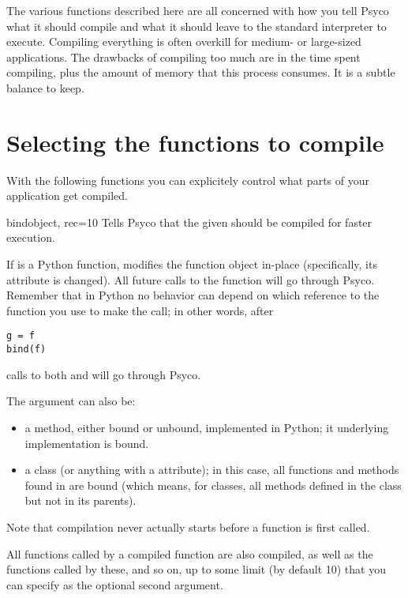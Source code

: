 \documentclass{manual}
\begin{document}
The various functions described here are all concerned with how you tell Psyco what it should compile and what it should leave to the standard interpreter to execute.  Compiling everything is often overkill for medium- or large-sized applications.  The drawbacks of compiling too much are in the time spent compiling, plus the amount of memory that this process consumes.  It is a subtle balance to keep.


\section{Selecting the functions to compile}

With the following functions you can explicitely control what parts of your application get compiled.

\begin{funcdesc}{bind}{object, rec=10}
  Tells Psyco that the given  should be compiled for faster execution.

  If  is a Python function,   modifies the function object in-place (specifically, its  attribute is changed).  All future calls to the function will go through Psyco.  Remember that in Python no behavior can depend on which reference to the function you use to make the call; in other words, after

\begin{verbatim}
g = f
bind(f)
\end{verbatim}

  calls to both  and  will go through Psyco.

  The  argument can also be:
  \begin{itemize}
    \item a method, either bound or unbound, implemented in Python; it underlying implementation is bound.
    \item a class (or anything with a  attribute); in this case, all functions and methods found in  are bound (which means, for classes, all methods defined in the class but not in its parents).
  \end{itemize}

  Note that compilation never actually starts before a function is first called.

  All functions called by a compiled function are also compiled, as well as the functions called by these, and so on, up to some limit (by default 10) that you can specify as the optional second argument.
\end{funcdesc}
\end{document}
